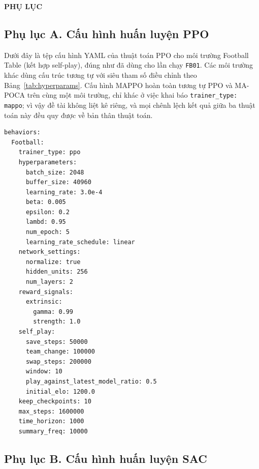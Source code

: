 \fontsize{13pt}{20pt}\selectfont

{}
\begin{center}
    {\large\bfseries PHỤ LỤC}
\end{center}


\subsection*{Phụ lục A. Cấu hình huấn luyện PPO}

Dưới đây là tệp cấu hình YAML của thuật toán PPO cho môi trường Football Table
(kết hợp self-play), đúng như đã dùng cho lần chạy \texttt{FB01}. Các môi trường khác
dùng cấu trúc tương tự với siêu tham số điều chỉnh theo Bảng~\ref{tab:hyperparams}.
Cấu hình MAPPO hoàn toàn tương tự PPO và MA-POCA trên cùng một môi trường, chỉ khác ở
việc khai báo \texttt{trainer\_type: mappo}; vì vậy đề tài không liệt kê riêng, và mọi
chênh lệch kết quả giữa ba thuật toán này đều quy được về bản thân thuật toán.

\begin{lstlisting}[basicstyle=\ttfamily\scriptsize,caption={football\_ppo.yaml},captionpos=b]
behaviors:
  Football:
    trainer_type: ppo
    hyperparameters:
      batch_size: 2048
      buffer_size: 40960
      learning_rate: 3.0e-4
      beta: 0.005
      epsilon: 0.2
      lambd: 0.95
      num_epoch: 5
      learning_rate_schedule: linear
    network_settings:
      normalize: true
      hidden_units: 256
      num_layers: 2
    reward_signals:
      extrinsic:
        gamma: 0.99
        strength: 1.0
    self_play:
      save_steps: 50000
      team_change: 100000
      swap_steps: 200000
      window: 10
      play_against_latest_model_ratio: 0.5
      initial_elo: 1200.0
    keep_checkpoints: 10
    max_steps: 1600000
    time_horizon: 1000
    summary_freq: 10000
\end{lstlisting}

\subsection*{Phụ lục B. Cấu hình huấn luyện SAC}

